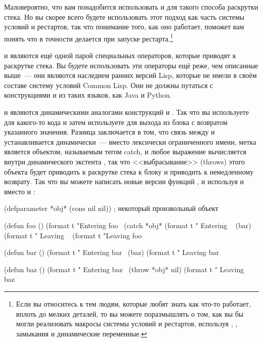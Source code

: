 Маловероятно, что вам понадобится использовать  и  для такого
способа раскрутки стека.  Но вы скорее всего будете использовать этот подход как часть
системы условий и рестартов, так что понимание того, как оно работает, поможет вам понять
что в точности делается при запуске рестарта.\footnote{Если вы относитесь к тем людям,
  которые любят знать как что-то работает, вплоть до мелких деталей, то вы можете
  поразмышлять о том, как вы бы могли реализовать макросы системы условий и рестартов,
  используя , , замыкания и динамические переменные.}

 и  являются ещё одной парой специальных операторов, которые
приводят к раскрутке стека.  Вы будете использовать эти операторы ещё реже, чем описанные
выше~--- они являются наследием ранних версий Lisp, которые не имели в своём составе
систему условий Common Lisp.  Они не должны путаться с конструкциями  и
 из таких языков, как Java и Python.

 и  являются динамическими аналогами конструкций  и
.  Так что вы используете  для какого-то кода и затем
используете  для выхода из блока  с возвратом указанного значения.
Разница заключается в том, что связь между  и  устанавливается
динамически~--- вместо лексически ограниченного имени, метка  является
объектом, называемым тегом catch, и любое выражение  вычисляется внутри
динамического экстента , так что <<выбрасывание>> (throws) этого объекта будет
приводить к раскрутке стека к блоку  и приводить к немедленному возврату.  Так
что вы можете написать новые версии функций ,  и  используя
 и  вместо  и :

\begin{myverb}
(defparameter *obj* (cons nil nil)) ; некоторый произвольный объект

(defun foo ()
  (format t "Entering foo~%
  (catch *obj*
    (format t " Entering ~%
    (bar)
    (format t " Leaving ~%
  (format t "Leaving foo~%

(defun bar ()
  (format t "  Entering bar~%
  (baz)
  (format t "  Leaving bar~%

(defun baz ()
  (format t "   Entering baz~%
  (throw *obj* nil)
  (format t "   Leaving baz~%
\end{myverb}

